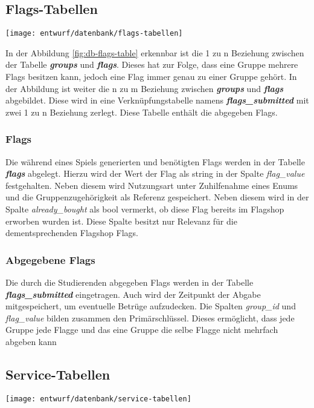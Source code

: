 \subsection{Flags-Tabellen}
\begin{center}
	\texttt{[image: entwurf/datenbank/flags-tabellen]}
	\label{fig:db-flags-table}
\end{center}


In der Abbildung \ref{fig:db-flags-table} erkennbar ist die 1 zu n Beziehung zwischen der Tabelle \textbf{\textit{groups}} und \textbf{\textit{flags}}. Dieses hat zur Folge, dass eine Gruppe mehrere Flags besitzen kann, jedoch eine Flag immer genau zu einer Gruppe gehört. In der Abbildung ist weiter die n zu m Beziehung zwischen \textbf{\textit{groups}} und \textbf{\textit{flags}} abgebildet. Diese wird in eine Verknüpfungstabelle namens \textbf{\textit{flags\_submitted}} mit zwei 1 zu n Beziehung zerlegt. Diese Tabelle enthält die abgegeben Flags.
 
\subsubsection{Flags}
Die während eines Spiels generierten und benötigten Flags werden in der Tabelle \textbf{\textit{flags}} abgelegt. Hierzu wird der Wert der Flag als string in der Spalte \textit{flag\_value} festgehalten. Neben diesem wird Nutzungsart unter Zuhilfenahme eines Enums und die Gruppenzugehörigkeit als Referenz gespeichert. Neben diesem wird in der Spalte \textit{already\_bought} als bool vermerkt, ob diese Flag bereits im Flagshop erworben wurden ist. Diese Spalte besitzt nur Relevanz für die dementsprechenden Flagshop Flags.

\subsubsection{Abgegebene Flags}
Die durch die Studierenden abgegeben Flags werden in der Tabelle \textbf{\textit{flags\_submitted}} eingetragen. Auch wird der Zeitpunkt der Abgabe mitgespeichert, um eventuelle Betrüge aufzudecken. Die Spalten \textit{group\_id} und \textit{flag\_value} bilden zusammen den Primärschlüssel. Dieses ermöglicht, dass jede Gruppe jede Flagge und das eine Gruppe die selbe Flagge nicht mehrfach abgeben kann

\subsection{Service-Tabellen}
\begin{center}
	\texttt{[image: entwurf/datenbank/service-tabellen]}
	\label{fig:db-service-table}
\end{center}


